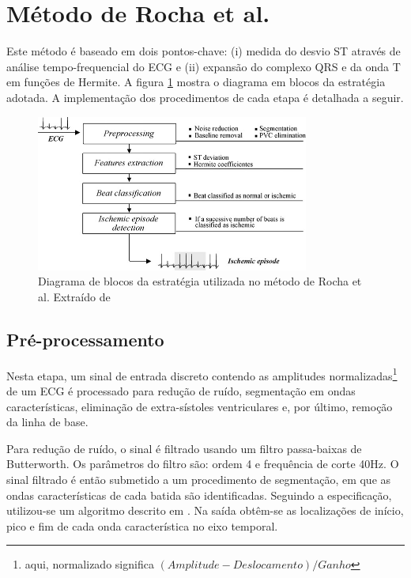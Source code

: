 
\section{Método de Rocha et al.}
\label{sec:section2}
Este método é baseado em dois pontos-chave: (i) medida do desvio ST através de análise tempo-frequencial do ECG e (ii) expansão do complexo QRS e da onda T em funções de Hermite. A figura \ref{fig:rocha_01} mostra o diagrama em blocos da estratégia adotada. A implementação dos procedimentos de cada etapa é detalhada a seguir.

\begin{figure}[h]
    \centering
    \includegraphics[width=0.8\textwidth]{figures/rocha_01.png}
    \caption{Diagrama de blocos da estratégia utilizada no método de Rocha et al. Extraído de \cite{Rocha10}}
    \label{fig:rocha_01}
\end{figure}

\subsection{Pré-processamento}
Nesta etapa, um sinal de entrada discreto contendo as amplitudes normalizadas\footnote{aqui, normalizado significa $(Amplitude - Deslocamento) / Ganho$} de um ECG é processado para redução de ruído, segmentação em ondas características, eliminação de extra-sístoles ventriculares e, por último, remoção da linha de base.

Para redução de ruído, o sinal é filtrado usando um filtro passa-baixas de Butterworth. Os parâmetros do filtro são: ordem 4 e frequência de corte 40Hz. O sinal filtrado é então submetido a um procedimento de segmentação, em que as ondas características de cada batida são identificadas. Seguindo a especificação, utilizou-se um algoritmo descrito em \cite{Sun05}. Na saída obtêm-se as localizações de início, pico e fim de cada onda característica no eixo temporal.

